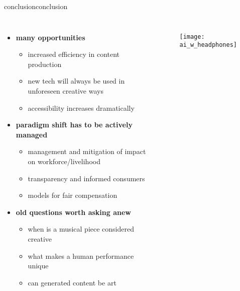\begin{frame}{conclusion}{conclusion}
    \vspace{-7mm}
    \begin{columns}
        \begin{itemize}
             \item   \textbf{many opportunities}
                \begin{itemize}
                    \item increased efficiency in content production
                    \item new tech will always be used in unforeseen creative ways
                    \item accessibility increases dramatically
                \end{itemize}
            \smallskip
           \item   \textbf{paradigm shift has to be actively managed}
                \begin{itemize}
                    \item management and mitigation of impact on workforce/livelihood
                    \item transparency and informed consumers
                    \item models for fair compensation
                \end{itemize}
            \smallskip
            \item   \textbf{old questions worth asking anew}
                \begin{itemize}
                    \item when is a musical piece considered creative
                    \item what makes a human performance unique
                    \item can generated content be art
                \end{itemize}
        \end{itemize}
        \vspace{20mm}
        \begin{figure}%
            \texttt{[image: ai\_w\_headphones]}%
        \end{figure}
    \end{columns}
\end{frame}
